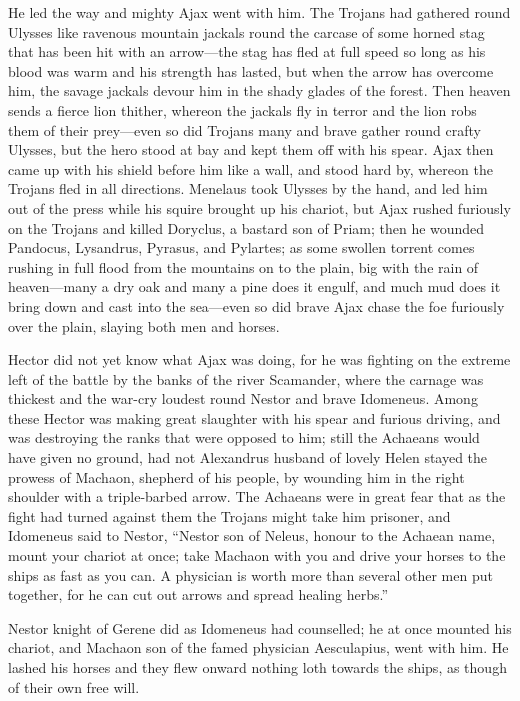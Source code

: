 He led the way and mighty Ajax went with him. The Trojans had gathered
round Ulysses like ravenous mountain jackals round the carcase of some
horned stag that has been hit with an arrow—the stag has fled at
full speed so long as his blood was warm and his strength has lasted, but
when the arrow has overcome him, the savage jackals devour him in the
shady glades of the forest. Then heaven sends a fierce lion thither,
whereon the jackals fly in terror and the lion robs them of their prey—even
so did Trojans many and brave gather round crafty Ulysses, but the hero
stood at bay and kept them off with his spear. Ajax then came up with his
shield before him like a wall, and stood hard by, whereon the Trojans fled
in all directions. Menelaus took Ulysses by the hand, and led him out of
the press while his squire brought up his chariot, but Ajax rushed
furiously on the Trojans and killed Doryclus, a bastard son of Priam; then
he wounded Pandocus, Lysandrus, Pyrasus, and Pylartes; as some swollen
torrent comes rushing in full flood from the mountains on to the plain,
big with the rain of heaven—many a dry oak and many a pine does it
engulf, and much mud does it bring down and cast into the sea—even
so did brave Ajax chase the foe furiously over the plain, slaying both men
and horses.

Hector did not yet know what Ajax was doing, for he was fighting on the
extreme left of the battle by the banks of the river Scamander, where the
carnage was thickest and the war-cry loudest round Nestor and brave
Idomeneus. Among these Hector was making great slaughter with his spear
and furious driving, and was destroying the ranks that were opposed to
him; still the Achaeans would have given no ground, had not Alexandrus
husband of lovely Helen stayed the prowess of Machaon, shepherd of his
people, by wounding him in the right shoulder with a triple-barbed arrow.
The Achaeans were in great fear that as the fight had turned against them
the Trojans might take him prisoner, and Idomeneus said to Nestor, “Nestor
son of Neleus, honour to the Achaean name, mount your chariot at once;
take Machaon with you and drive your horses to the ships as fast as you
can. A physician is worth more than several other men put together, for he
can cut out arrows and spread healing herbs.”

Nestor knight of Gerene did as Idomeneus had counselled; he at once
mounted his chariot, and Machaon son of the famed physician Aesculapius,
went with him. He lashed his horses and they flew onward nothing loth
towards the ships, as though of their own free will.

